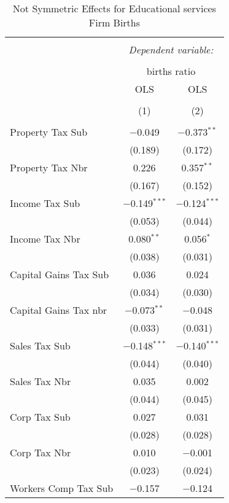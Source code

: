 
\begin{table}[!htbp] \centering 
  \caption{Not Symmetric Effects for  Educational services Firm Births} 
  \label{61noequality} 
\footnotesize 
\begin{tabular}{@{\extracolsep{5pt}}lcc} 
\\[-1.8ex]\hline 
\hline \\[-1.8ex] 
 & \multicolumn{2}{c}{\textit{Dependent variable:}} \\ 
\cline{2-3} 
\\[-1.8ex] & \multicolumn{2}{c}{births ratio} \\ 
 & OLS & OLS \\ 
\\[-1.8ex] & (1) & (2)\\ 
\hline \\[-1.8ex] 
 Property Tax Sub & $-$0.049 & $-$0.373$^{**}$ \\ 
  & (0.189) & (0.172) \\ 
  Property Tax Nbr & 0.226 & 0.357$^{**}$ \\ 
  & (0.167) & (0.152) \\ 
  Income Tax Sub & $-$0.149$^{***}$ & $-$0.124$^{***}$ \\ 
  & (0.053) & (0.044) \\ 
  Income Tax Nbr & 0.080$^{**}$ & 0.056$^{*}$ \\ 
  & (0.038) & (0.031) \\ 
  Capital Gains Tax Sub & 0.036 & 0.024 \\ 
  & (0.034) & (0.030) \\ 
  Capital Gains Tax nbr & $-$0.073$^{**}$ & $-$0.048 \\ 
  & (0.033) & (0.031) \\ 
  Sales Tax Sub & $-$0.148$^{***}$ & $-$0.140$^{***}$ \\ 
  & (0.044) & (0.040) \\ 
  Sales Tax Nbr & 0.035 & 0.002 \\ 
  & (0.044) & (0.045) \\ 
  Corp Tax Sub & 0.027 & 0.031 \\ 
  & (0.028) & (0.028) \\ 
  Corp Tax Nbr & 0.010 & $-$0.001 \\ 
  & (0.023) & (0.024) \\ 
  Workers Comp Tax Sub & $-$0.157 & $-$0.124 \\ 

\end{tabular}
\end{table}
